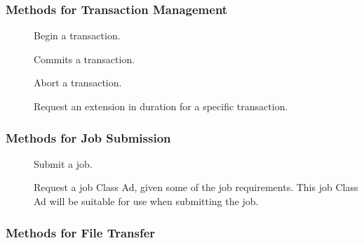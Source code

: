\subsubsection{\label{WebService-Transactions} Methods for Transaction Management}

\begin{description}
\item []
  Begin a transaction.
\item []
  Commits a transaction.
\item []
  Abort a transaction.
\item []
  Request an extension in duration for a specific transaction.
\end{description}

\subsubsection{\label{WebService-Submission} Methods for Job Submission}

\begin{description}
\item []
  Submit a job.
\item []
  Request a job Class Ad, given some of the job requirements.
  This job Class Ad will be suitable for use when submitting the job.


\end{description}

\subsubsection{\label{WebService-FileTransfer} Methods for File Transfer}

